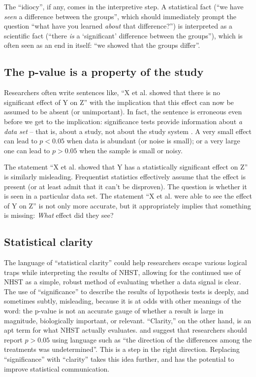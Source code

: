 \documentclass[12pt, english, dvipsnames, table]{article} %
\newcommand{\pval}{p-value\xspace}
\begin{document}
The ``idiocy'', if any, comes in the interpretive step. A statistical fact (``we have \emph{seen} a difference between the groups'', which should immediately prompt the question ``what have you learned \emph{about} that difference?'') is interpreted as a scientific fact (``there \emph{is} a `significant' difference between the groups''), which is often seen as an end in itself: ``we showed that the groups differ''.

\subsection*{The \pval is a property of the study}

\noindent Researchers often write sentences like, ``X et al. showed that there is no significant effect of Y on Z'' with the implication that this effect can now be assumed to be absent (or unimportant). In fact, the sentence is erroneous even before we get to the implication: significance tests provide information about \emph{a data set} -- that is, about a study, not about the study system \citep{HoenigandHeisey2001}. A very small effect can lead to $p < 0.05$ when data is abundant (or noise is small); or a very large one can lead to $p > 0.05$ when the sample is small or noisy. 

The statement ``X et al. showed that Y has a statistically significant effect on Z'' is similarly misleading. Frequentist statistics effectively assume that the effect is present (or at least admit that it can't be disproven). The question is whether it is seen in a particular data set. The statement ``X et al. were able to see the effect of Y on Z'' is not only more accurate, but it appropriately implies that something is missing: \emph{What} effect did they see?

\subsection*{Statistical clarity}

\noindent The language of ``statistical clarity'' could help researchers escape various logical traps while interpreting the results of NHST, allowing for the continued use of NHST as a simple, robust method of evaluating whether a data signal is clear. The use of ``significance'' to describe the results of hypothesis tests is deeply, and sometimes subtly, misleading, because it is at odds with other meanings of the word: the \pval is not an accurate gauge of whether a result is large in magnitude, biologically important, or relevant. ``Clarity,'' on the other hand, is an apt term for what NHST actually evaluates. \citet{jones2000sensible} and \citet{robinson2001past} suggest that researchers should report $p > 0.05$ using language such as ``the direction of the differences among the treatments was undetermined''. This is a step in the right direction. Replacing ``significance'' with ``clarity'' takes this idea further, and has the potential to improve statistical communication.
\end{document}
